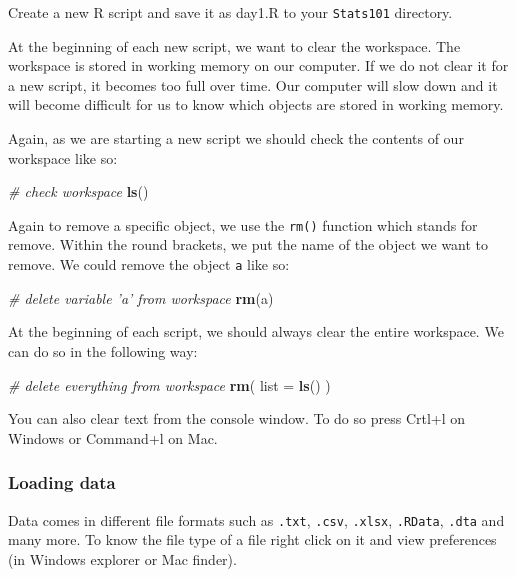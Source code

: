 \documentclass[]{article}
\newenvironment{Shaded}{\begin{snugshade}}{\end{snugshade}}
\newcommand{\CommentTok}[1]{\textcolor[rgb]{0.56,0.35,0.01}{\textit{#1}}}
\newcommand{\DataTypeTok}[1]{\textcolor[rgb]{0.13,0.29,0.53}{#1}}
\newcommand{\KeywordTok}[1]{\textcolor[rgb]{0.13,0.29,0.53}{\textbf{#1}}}
\newcommand{\NormalTok}[1]{#1}
\begin{document}
Create a new R script and save it as day1.R to your \texttt{Stats101} directory.

At the beginning of each new script, we want to clear the workspace. The workspace is stored in working memory on our computer. If we do not clear it for a new script, it becomes too full over time. Our computer will slow down and it will become difficult for us to know which objects are stored in working memory.

Again, as we are starting a new script we should check the contents of our workspace like so:

\begin{Shaded}
\begin{Highlighting}[]
\CommentTok{# check workspace}
\KeywordTok{ls}\NormalTok{()}
\end{Highlighting}
\end{Shaded}

Again to remove a specific object, we use the \texttt{rm()} function which stands for remove. Within the round brackets, we put the name of the object we want to remove. We could remove the object \texttt{a} like so:

\begin{Shaded}
\begin{Highlighting}[]
\CommentTok{# delete variable 'a' from workspace}
\KeywordTok{rm}\NormalTok{(a)}
\end{Highlighting}
\end{Shaded}

At the beginning of each script, we should always clear the entire workspace. We can do so in the following way:

\begin{Shaded}
\begin{Highlighting}[]
\CommentTok{# delete everything from workspace}
\KeywordTok{rm}\NormalTok{( }\DataTypeTok{list =} \KeywordTok{ls}\NormalTok{() )}
\end{Highlighting}
\end{Shaded}

You can also clear text from the console window. To do so press Crtl+l on Windows or Command+l on Mac.

\hypertarget{loading-data}{%
\subsubsection{Loading data}\label{loading-data}}

Data comes in different file formats such as \texttt{.txt}, \texttt{.csv}, \texttt{.xlsx}, \texttt{.RData}, \texttt{.dta} and many more. To know the file type of a file right click on it and view preferences (in Windows explorer or Mac finder).
\end{document}
